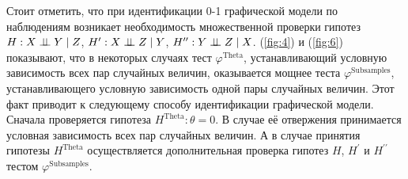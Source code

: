 Стоит отметить, что при идентификации 0-1 графической модели
по наблюдениям
возникает необходимость множественной проверки гипотез\\
$H: X \perp\!\!\!\perp Y \mid Z$, $H^{\prime}: X \perp\!\!\!\perp Z \mid Y$, 
$H^{\prime \prime}: Y \perp\!\!\!\perp Z \mid X$.
(\autoref{fig:4}) и (\autoref{fig:6}) показывают, что
в некоторых случаях тест $\varphi^{\text{Theta}}$, 
устанавливающий условную зависимость всех пар случайных величин,
оказывается мощнее теста $\varphi^{\text{Subsamples}}$, устанавливающего условную зависимость
одной пары случайных величин. 
Этот факт приводит к следующему способу идентификации графической
модели.
Сначала проверяется гипотеза
$H^{\text{Theta}}: \theta=0$. В случае её отвержения принимается
условная зависимость всех пар случайных величин. 
А в случае принятия гипотезы $H^{\text{Theta}}$ осуществляется 
дополнительная проверка гипотез $H$, $H^{\prime}$ и 
$H^{\prime \prime}$ тестом $\varphi^{\text{Subsamples}}$.








